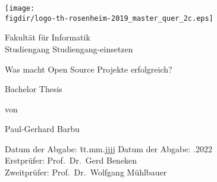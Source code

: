 \begin{titlepage}

\sffamily

\raggedleft

\vspace*{-2cm}

\texttt{[image: \\figdir/logo-th-rosenheim-2019\_master\_quer\_2c.eps]}

\vfill

\centering
\LARGE
Fakultät für Informatik  \vspace{0.5cm}\\
\Large
Studiengang Studiengang-einsetzen

\vspace{2cm}

\LARGE

Was macht Open Source Projekte erfolgreich?

\vspace{2cm}

\Large
Bachelor Thesis

\vspace{1.5cm}


\Large
von

\vspace{0.5cm}


\LARGE
Paul-Gerhard Barbu\vspace{1cm}

\vspace{1cm}

\flushleft
 \Large
\vspace*{\fill}

\begin{tabbing}
Datum der Abgabe: \= tt.mm.jjjj \kill
Datum der Abgabe: .2022 \\
Erstprüfer: \> Prof.\ Dr.\ Gerd Beneken\\
Zweitprüfer: \> Prof.\ Dr.\ Wolfgang Mühlbauer
\end{tabbing}

\end{titlepage}

\cleardoubleemptypage

